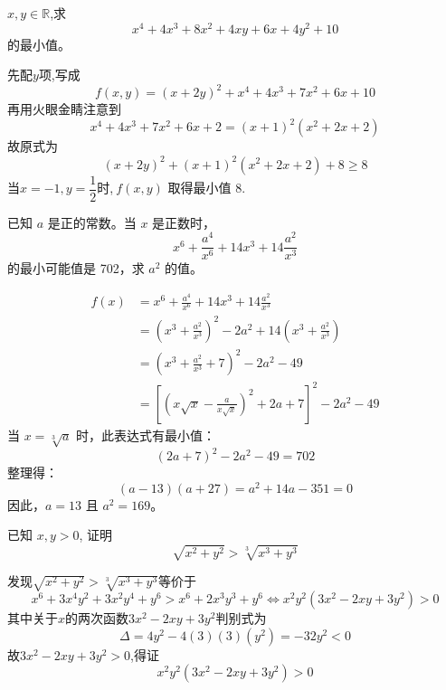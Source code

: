 \begin{questions}
    \question \(x,y \in \mathbb{R}\),求
    \[
    x^4 + 4x^3 + 8x^2 + 4xy + 6x + 4y^2 + 10
    \]
    的最小值。 
    \begin{solution}
        先配$y$项,写成
        \[
        f(x,y)=(x+2y)^2 + x^4 + 4x^3 + 7x^2+ 6x + 10
        \]
        再用火眼金睛注意到
        \[
        x^4 + 4x^3 + 7x^2+ 6x + 2=(x + 1)^2 (x^2 + 2 x + 2)    
        \]
        故原式为
        \[
        (x+2y)^2+(x + 1)^2 (x^2 + 2 x + 2)+8 \geq 8
        \]
        当$x=-1,y=\dfrac12$时,$\ f(x,y)$ 取得最小值 $8$.
    \end{solution}

    \question 已知 $a$ 是正的常数。当 $x$ 是正数时，
\[ x^6 + \frac{a^4}{x^6} + 14x^3 + 14\frac{a^2}{x^3} \]
的最小可能值是 702，求 $a^2$ 的值。

\begin{solution}
\begin{align*}
f(x) &= x^6 + \frac{a^4}{x^6} + 14x^3 + 14\frac{a^2}{x^3} \\
&= \left( x^3 + \frac{a^2}{x^3} \right)^2 - 2a^2 + 14 \left( x^3 + \frac{a^2}{x^3} \right) \\
&= \left( x^3 + \frac{a^2}{x^3} + 7 \right)^2 - 2a^2 - 49 \\
&= \left[ \left( x\sqrt{x} - \frac{a}{x\sqrt{x}} \right)^2 + 2a + 7 \right]^2 - 2a^2 - 49
\end{align*}
当 $x = \sqrt[3]{a}$ 时，此表达式有最小值：
\[ (2a + 7)^2 - 2a^2 - 49 = 702 \]
整理得：
\[ (a - 13)(a + 27) = a^2 + 14a - 351 = 0 \]
因此，$a = 13$ 且 $a^2 = 169$。
\end{solution}

    \question 已知 $x,y>0$, 证明
    \[
    \sqrt{x^2+y^2} > \sqrt[3]{x^3+y^3}
    \]
    \begin{solution}
        发现$\sqrt{x^2+y^2} > \sqrt[3]{x^3+y^3}$等价于
        \[
        x^6+3x^4y^2+3x^2y^4+y^6 > x^6+2x^3y^3+y^6 \Leftrightarrow x^2y^2(3x^2-2xy+3y^2) > 0
        \]
        其中关于$x$的两次函数$3x^2-2xy+3y^2$判别式为
        \[
        \Delta = 4y^2-4(3)(3)(y^2) =-32y^2< 0
        \]
        故$3x^2-2xy+3y^2 > 0$,得证
        \[
        x^2y^2(3x^2-2xy+3y^2) > 0
        \]
    \end{solution}


\end{questions}
